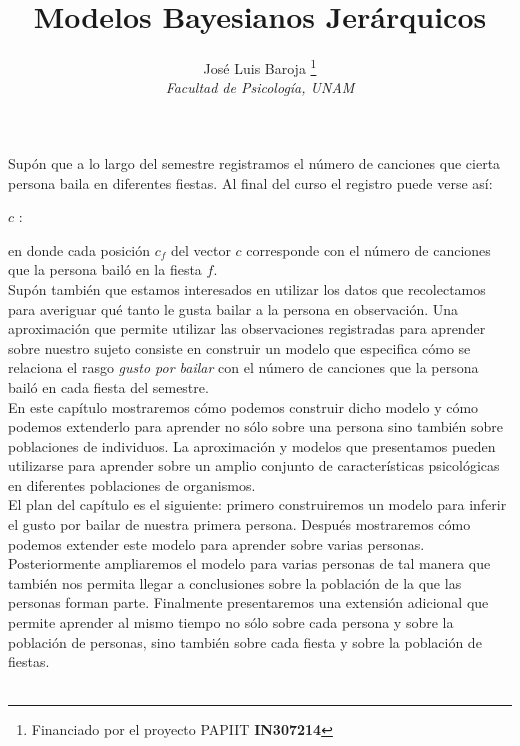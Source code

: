 \documentclass{article}
\title{Modelos Bayesianos Jerárquicos}
\author{\Large José Luis Baroja
\thanks{Financiado por el proyecto PAPIIT \bf{IN307214}}
	\\\emph{Facultad de Psicología, UNAM}
	}
\date{}
\begin{document}
\maketitle

Supón que a lo largo del semestre registramos el número de canciones que cierta persona baila en diferentes fiestas. Al final del curso el registro puede verse así:\\

\centerline{ $c$ : \texttt{\;\;\;\;\;\;\;\;\;\;\;\;\;\;\;\;\;\;\;\;\;\;\;\;\;\;\;\;\;\;\;\;\;\;}}\hfill

\noindent en donde cada posición $c_f$ del vector $c$ corresponde con el número de canciones que la persona bailó en la fiesta $f$.\\
\indent Supón también que estamos interesados en utilizar los datos que recolectamos para averiguar qué tanto le gusta bailar a la persona en observación. Una aproximación que permite utilizar las observaciones registradas para aprender sobre nuestro sujeto consiste en construir un modelo que especifica cómo se relaciona el rasgo \emph{gusto por bailar} con el número de canciones que la persona bailó en cada fiesta  del semestre.\\
\indent En este capítulo mostraremos cómo podemos construir dicho modelo y cómo podemos extenderlo para aprender no sólo sobre una persona sino también sobre poblaciones de individuos. La aproximación y modelos que presentamos pueden utilizarse para aprender sobre un amplio conjunto de características psicológicas en diferentes poblaciones de organismos.\\ 
\indent El plan del capítulo es el siguiente: primero construiremos un modelo para inferir el gusto por bailar de nuestra primera persona. Después mostraremos cómo podemos extender este modelo para aprender sobre varias personas. Posteriormente ampliaremos el modelo para varias personas de tal manera que también nos permita llegar a conclusiones sobre la población de la que las personas forman parte. Finalmente presentaremos una extensión adicional que permite aprender al mismo tiempo no sólo sobre cada persona y sobre la población de personas, sino también sobre cada fiesta y sobre la población de fiestas.\\\\
\end{document}
